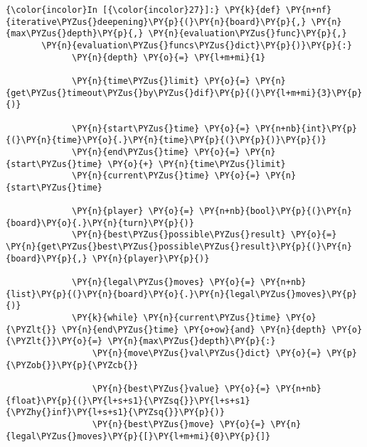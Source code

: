    \begin{Verbatim}[commandchars=\\\{\}]
{\color{incolor}In [{\color{incolor}27}]:} \PY{k}{def} \PY{n+nf}{iterative\PYZus{}deepening}\PY{p}{(}\PY{n}{board}\PY{p}{,} \PY{n}{max\PYZus{}depth}\PY{p}{,} \PY{n}{evaluation\PYZus{}func}\PY{p}{,} 
	   \PY{n}{evaluation\PYZus{}funcs\PYZus{}dict}\PY{p}{)}\PY{p}{:}
             \PY{n}{depth} \PY{o}{=} \PY{l+m+mi}{1}
         
             \PY{n}{time\PYZus{}limit} \PY{o}{=} \PY{n}{get\PYZus{}timeout\PYZus{}by\PYZus{}dif}\PY{p}{(}\PY{l+m+mi}{3}\PY{p}{)}
         
             \PY{n}{start\PYZus{}time} \PY{o}{=} \PY{n+nb}{int}\PY{p}{(}\PY{n}{time}\PY{o}{.}\PY{n}{time}\PY{p}{(}\PY{p}{)}\PY{p}{)}
             \PY{n}{end\PYZus{}time} \PY{o}{=} \PY{n}{start\PYZus{}time} \PY{o}{+} \PY{n}{time\PYZus{}limit}
             \PY{n}{current\PYZus{}time} \PY{o}{=} \PY{n}{start\PYZus{}time}
         
             \PY{n}{player} \PY{o}{=} \PY{n+nb}{bool}\PY{p}{(}\PY{n}{board}\PY{o}{.}\PY{n}{turn}\PY{p}{)}
             \PY{n}{best\PYZus{}possible\PYZus{}result} \PY{o}{=} \PY{n}{get\PYZus{}best\PYZus{}possible\PYZus{}result}\PY{p}{(}\PY{n}{board}\PY{p}{,} \PY{n}{player}\PY{p}{)}
         
             \PY{n}{legal\PYZus{}moves} \PY{o}{=} \PY{n+nb}{list}\PY{p}{(}\PY{n}{board}\PY{o}{.}\PY{n}{legal\PYZus{}moves}\PY{p}{)}
             \PY{k}{while} \PY{n}{current\PYZus{}time} \PY{o}{\PYZlt{}} \PY{n}{end\PYZus{}time} \PY{o+ow}{and} \PY{n}{depth} \PY{o}{\PYZlt{}}\PY{o}{=} \PY{n}{max\PYZus{}depth}\PY{p}{:}
                 \PY{n}{move\PYZus{}val\PYZus{}dict} \PY{o}{=} \PY{p}{\PYZob{}}\PY{p}{\PYZcb{}}
         
                 \PY{n}{best\PYZus{}value} \PY{o}{=} \PY{n+nb}{float}\PY{p}{(}\PY{l+s+s1}{\PYZsq{}}\PY{l+s+s1}{\PYZhy{}inf}\PY{l+s+s1}{\PYZsq{}}\PY{p}{)}
                 \PY{n}{best\PYZus{}move} \PY{o}{=} \PY{n}{legal\PYZus{}moves}\PY{p}{[}\PY{l+m+mi}{0}\PY{p}{]}
         

\end{Verbatim}
